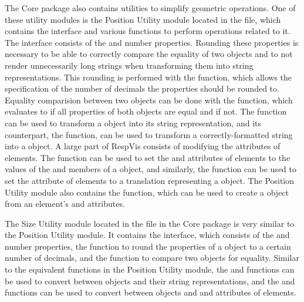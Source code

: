 The Core package also contains utilities to simplify geometric
operations. One of these utility modules is the Position Utility
module located in the  file, which
contains the  interface and various functions to
perform operations related to it.  The  interface
consists of the  and  number properties. Rounding
these properties is necessary to be able to correctly compare the
equality of two  objects and to not render
unnecessarily long strings when transforming them into string
representations. This rounding is performed with the
 function, which allows the specification of the
number of decimals the properties should be rounded to. Equality
comparision between two  objects can be done with the
 function, which evaluates to  if all
properties of both  objects are equal and 
if not. The  function can be used to transform
a  object into its  string
representation, and its counterpart, the 
function, can be used to transform a correctly-formatted string into a
 object. A large part of RespVis consists of modifying
the attributes of elements. The  function can be
used to set the  and  attributes of elements
to the values of the  and  members of a
 object, and similarly, the
 function can be used to set the
 attribute of elements to a translation
representing a  object. The Position Utility module
also contains the  function, which can be used
to create a  object from an element's  and
 attributes.

The Size Utility module located in the
 file in the Core package is very
similar to the Position Utility module. It contains the
 interface, which consists of the  and
 number properties, the  function to
round the properties of a  object to a certain number of
decimals, and the  function to compare two
 objects for equality. Similar to the equivalent functions
in the Position Utility module, the  and
 functions can be used to convert between
 objects and their string representations, and the
 and  functions can be used to
convert between  objects and  and
 attributes of elements.

